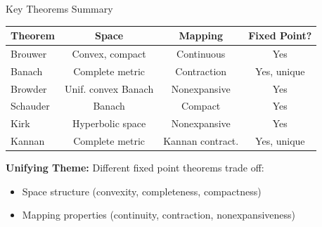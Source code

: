 \documentclass[aspectratio=169,10pt]{beamer}
\begin{document}
\begin{frame}{Key Theorems Summary}
    \begin{table}
        \centering
        \small
        \begin{tabular}{|l|c|c|c|}
            \hline
            \textbf{Theorem} & \textbf{Space} & \textbf{Mapping} & \textbf{Fixed Point?} \\
            \hline
            Brouwer & Convex, compact & Continuous & Yes \\
            \hline
            Banach & Complete metric & Contraction & Yes, unique \\
            \hline
            Browder & Unif. convex Banach & Nonexpansive & Yes \\
            \hline
            Schauder & Banach & Compact & Yes \\
            \hline
            Kirk & Hyperbolic space & Nonexpansive & Yes \\
            \hline
            Kannan & Complete metric & Kannan contract. & Yes, unique \\
            \hline
        \end{tabular}
    \end{table}

    \vspace{0.4cm}
    \textbf{Unifying Theme:} Different fixed point theorems trade off:
    \begin{itemize}
        \item Space structure (convexity, completeness, compactness)
        \item Mapping properties (continuity, contraction, nonexpansiveness)
    \end{itemize}
\end{frame}
\end{document}

